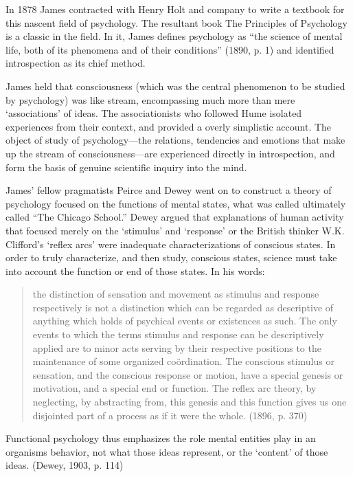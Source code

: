 In 1878 James contracted with Henry Holt and company to write a textbook for this nascent field of psychology. The resultant book The Principles of Psychology is a classic in the field. In it, James defines psychology as “the science of mental life, both of its phenomena and of their conditions” (1890, p. 1) and identified introspection as its chief method.

James held that consciousness (which was the central phenomenon to be studied by psychology) was like stream, encompassing much more than mere ‘associations’ of ideas. The associationists who followed Hume isolated experiences from their context, and provided a overly simplistic account. The object of study of psychology---the relations, tendencies and emotions that make up the stream of consciousness---are experienced directly in introspection, and form the basis of genuine scientific inquiry into the mind.

James' fellow pragmatists Peirce and Dewey went on to construct a theory of psychology focused on the functions of mental states, what was called ultimately called “The Chicago School.” Dewey argued that explanations of human activity that focused merely on the `stimulus' and `response' or the British thinker W.K. Clifford’s ‘reflex arcs' were inadequate characterizations of conscious states. In order to truly characterize, and then study, conscious states, science must take into account the function or end of those states. In his words:

\begin{quote}

the distinction of sensation and movement as stimulus and response respectively is not a distinction which can be regarded as descriptive of anything which holds of psychical events or existences as such. The only events to which the terms stimulus and response can be descriptively applied are to minor acts serving by their respective positions to the maintenance of some organized coördination. The conscious stimulus or sensation, and the conscious response or motion, have a special genesis or motivation, and a special end or function. The reflex arc theory, by neglecting, by abstracting from, this genesis and this function gives us one disjointed part of a process as if it were the whole. (1896, p. 370)
\end{quote}

Functional psychology thus emphasizes the role mental entities play in an organisms behavior, not what those ideas represent, or the `content' of those ideas. (Dewey, 1903, p. 114)

